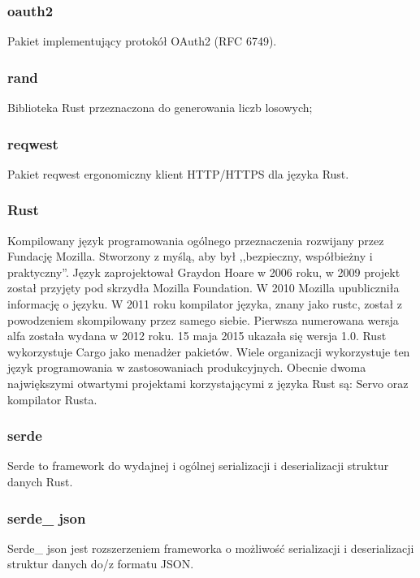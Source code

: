 \documentclass[12pt,a4paper]{article}
\begin{document}
				\subsubsection{oauth2}

					\indent Pakiet implementujący protokół OAuth2 (RFC 6749).
				\subsubsection{rand}

					\indent Biblioteka Rust przeznaczona do generowania liczb losowych;
				\subsubsection{reqwest}

					\indent Pakiet reqwest ergonomiczny klient HTTP/HTTPS dla języka Rust.
				\subsubsection{Rust}

					\indent Kompilowany język programowania ogólnego przeznaczenia rozwijany przez Fundację Mozilla. Stworzony z myślą, aby był ,,bezpieczny, współbieżny i praktyczny''.
					Język zaprojektował Graydon Hoare w 2006 roku, w 2009 projekt został przyjęty pod skrzydła Mozilla Foundation. W 2010 Mozilla upubliczniła informację o języku.
					W 2011 roku kompilator języka, znany jako rustc, został z powodzeniem skompilowany przez samego siebie. Pierwsza numerowana wersja alfa została wydana w 2012 roku.
					15 maja 2015 ukazała się wersja 1.0. Rust wykorzystuje Cargo jako menadżer pakietów. Wiele organizacji wykorzystuje ten język programowania w zastosowaniach
					produkcyjnych. Obecnie dwoma największymi otwartymi projektami korzystającymi z języka Rust są: Servo oraz kompilator Rusta. 
				\subsubsection{serde}

					\indent Serde to framework do wydajnej i ogólnej serializacji i deserializacji struktur danych Rust.
				\subsubsection{serde\_ json}

					\indent Serde\_ json jest rozszerzeniem frameworka o możliwość serializacji i deserializacji struktur danych do/z formatu JSON.
\end{document}
